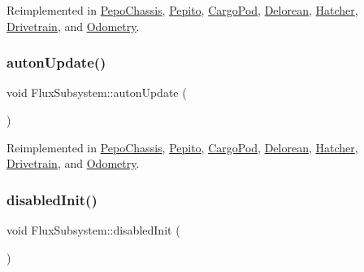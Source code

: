 Reimplemented in \hyperlink{classPepoChassis_a10380f1dad79ff1daa295d0673a1051f}{Pepo\+Chassis}, \hyperlink{classPepito_ac9a8b75ef48cd95683733af317618ca4}{Pepito}, \hyperlink{classCargoPod_a070623c3e9ca5b91765d68b63ccfa1eb}{Cargo\+Pod}, \hyperlink{classDelorean_ad06990e5c59d5f4d30b48015e744cc49}{Delorean}, \hyperlink{classHatcher_ac44bea31eb17578106c48914450a1be1}{Hatcher}, \hyperlink{classDrivetrain_a6aec7fa1a9daf1233a59fe0243d3bc8c}{Drivetrain}, and \hyperlink{classOdometry_a0ec037096f65e779248e6a99615f37ed}{Odometry}.

\mbox{\label{classFluxSubsystem_aceed900af22503022b8d1278f3693f77}} 
\subsubsection{\texorpdfstring{auton\+Update()}{autonUpdate()}}
{\footnotesize\ttfamily void Flux\+Subsystem\+::auton\+Update (\begin{DoxyParamCaption}{ }\end{DoxyParamCaption})\hspace{0.3cm}{\ttfamily [virtual]}}



Reimplemented in \hyperlink{classPepoChassis_ab1e73685898517c8fa2f81c5c7a6a56c}{Pepo\+Chassis}, \hyperlink{classPepito_a42cc57495399c63940571b113e7140f8}{Pepito}, \hyperlink{classCargoPod_ad11b20da5e057212dedd7a5ef34223b9}{Cargo\+Pod}, \hyperlink{classDelorean_a17c9b875c9c0d3c9b9dadd5838bfedfd}{Delorean}, \hyperlink{classHatcher_a5e21dc019a7f05b4bbbf39545a920f5a}{Hatcher}, \hyperlink{classDrivetrain_ab451b48c598fa715ff1a8117ddc6f705}{Drivetrain}, and \hyperlink{classOdometry_a5a19f4d904e5364ca75a91f97a8777a6}{Odometry}.

\mbox{\label{classFluxSubsystem_aa0b8fde8aa5094627d15d24e545e1da4}} 
\subsubsection{\texorpdfstring{disabled\+Init()}{disabledInit()}}
{\footnotesize\ttfamily void Flux\+Subsystem\+::disabled\+Init (\begin{DoxyParamCaption}{ }\end{DoxyParamCaption})\hspace{0.3cm}{\ttfamily [virtual]}}



